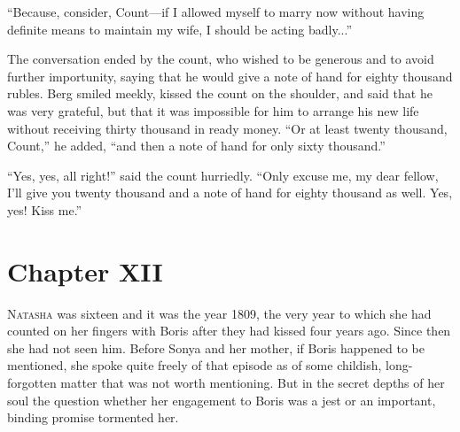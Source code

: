 ``Because, consider, Count---if I allowed myself to marry now
without having definite means to maintain my wife, I should be
acting badly...''

The conversation ended by the count, who wished to be generous
and to avoid further importunity, saying that he would give a
note of hand for eighty thousand rubles. Berg smiled meekly,
kissed the count on the shoulder, and said that he was very
grateful, but that it was impossible for him to arrange his new
life without receiving thirty thousand in ready money. ``Or at
least twenty thousand, Count,'' he added, ``and then a note of
hand for only sixty thousand.''

``Yes, yes, all right!'' said the count hurriedly. ``Only excuse
me, my dear fellow, I'll give you twenty thousand and a note of
hand for eighty thousand as well. Yes, yes! Kiss me.''


\chapter*{Chapter XII}
\ifaudio     
{} 
\fi

\lettrine[lines=2, loversize=0.3, lraise=0]{\initfamily N}{atasha}
was sixteen and it was the year 1809, the very year to
which she had counted on her fingers with Boris after they had
kissed four years ago. Since then she had not seen him. Before
Sonya and her mother, if Boris happened to be mentioned, she
spoke quite freely of that episode as of some childish,
long-forgotten matter that was not worth mentioning. But in the
secret depths of her soul the question whether her engagement to
Boris was a jest or an important, binding promise tormented her.

